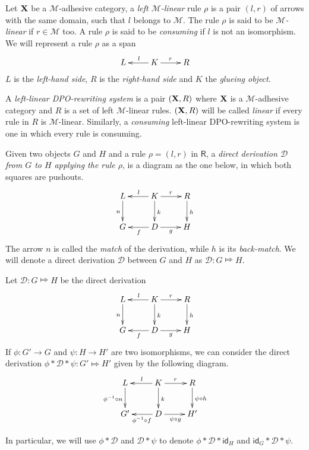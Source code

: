 \documentclass[a4paper,UKenglish,cleveref,pdftex, thm-restate,numberwithinsect]{lipics}
\newcommand{\id}[1]{\mathsf{id}_{#1}}
\def\R{\mathsf{R}}
\def\X{\textbf {\textup{X}}}
\newcommand{\dder}[1]{\mathscr{#1}}
\begin{document}
\begin{definition}
	Let $\X$ be a $\mathcal{M}$-adhesive category, a  \emph{left $\mathcal{M}$-linear} rule $\rho$ is a pair $(l,r)$ of arrows with the same domain, such that $l$ belongs to $\mathcal{M}$.  The rule $\rho$ is said to be \emph{$\mathcal{M}$-linear} if $r\in \mathcal{M}$ too. A rule $\rho$ is said to be \emph{consuming} if $l$ is not an isomorphism. We will represent a rule $\rho$ as a span 
	\[\xymatrix{L & K\ar[l]_{l} \ar[r]^{r} & R}\]
$L$ is the \emph{left-hand side}, $R$ is the \emph{right-hand side} and $K$ the \emph{glueing object}. 


A \emph{left-linear DPO-rewriting system} is a pair $(\X, \R)$ where $\X$ is a $\mathcal{M}$-adhesive category and $R$ is a set of left $\mathcal{M}$-linear rules. $(\X, \R)$ will be called \emph{linear} if every rule in $R$ is $\mathcal{M}$-linear. Similarly, a \emph{consuming} left-linear DPO-rewriting system is one in which every rule is consuming.

Given  two objects $G$ and $H$ and a rule $\rho=(l,r)$ in $\R$, a \emph{direct derivation $\mathscr{D}$ from $G$ to $H$ applying the rule $\rho$}, is a diagram as the one below, in which both squares are pushouts. 
	\[\xymatrix{L \ar[d]_{n}& K \ar[d]^{k}\ar[l]_{l} \ar[r]^{r} & R \ar[d]^{h}\\G & \ar[l]^{f} D \ar[r]_{g}& H}\]
	The arrow $n$ is called the \emph{match} of the derivation, while $h$ is its \emph{back-match}.
	We will denote a direct derivation $\dder{D}$ between $G$ and $H$ as $\dder{D}\colon G\Mapsto H$. 
\end{definition}

\begin{example}
\end{example}

\begin{remark}\label{exa:conc} Let  $\dder{D}\colon G\Mapsto H$ be the direct derivation 
		\[\xymatrix{L \ar[d]_{n}& K \ar[d]^{k}\ar[l]_{l} \ar[r]^{r} & R \ar[d]^{h}\\G & \ar[l]^{f} D \ar[r]_{g}& H}\]
	If $\phi\colon G'\to G$ and $\psi\colon H\to H'$ are two isomorphisms, 	we can consider the direct derivation	$\phi * \dder{D}*\psi \colon G'\Mapsto H'$ given by the following diagram.
	\[\xymatrix{L \ar[d]_{\phi^{-1} \circ n}& K \ar[d]^{k}\ar[l]_{l} \ar[r]^{r} & R \ar[d]^{\psi \circ h}\\G' & \ar[l]^{\phi^{-1} \circ f} D \ar[r]_{\psi \circ g}& H'}\]
	
	In particular, we will use $\phi*\dder{D}$ and $\dder{D}*\psi$  to denote $\phi*\dder{D}*\id{H}$ and $\id{G}*\dder{D}*\psi$.
\end{remark}
\end{document}
